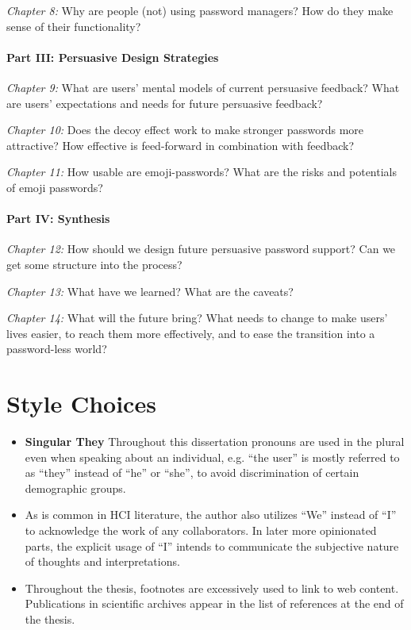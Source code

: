 \textit{Chapter 8:} %
Why are people (not) using password managers?
How do they make sense of their functionality?


\paragraph{Part III: Persuasive Design Strategies}
\textit{Chapter 9:} %
What are users' mental models of current persuasive feedback?
What are users' expectations and needs for future persuasive feedback?

\textit{Chapter 10:} %
Does the decoy effect work to make stronger passwords more attractive?
How effective is feed-forward in combination with feedback?

\textit{Chapter 11:} %
How usable are emoji-passwords?
What are the risks and potentials of emoji passwords?

\paragraph{Part IV: Synthesis}
\textit{Chapter 12:} %
How should we design future persuasive password support?
Can we get some structure into the process? 

\textit{Chapter 13:} %
What have we learned? 
What are the caveats?

\textit{Chapter 14:} %
What will the future bring?
What needs to change to make users' lives easier, to reach them more effectively, and to ease the transition into a password-less world?

\section{Style Choices}
\begin{itemize}
\item \textbf{Singular They} Throughout this dissertation pronouns are used in the plural even when speaking about an individual, e.g. ``the user'' is mostly referred to as ``they'' instead of ``he'' or ``she'', to avoid discrimination of certain demographic groups. 
\item As is common in HCI literature, the author also utilizes ``We'' instead of ``I'' to acknowledge the work of any collaborators. In later more opinionated parts, the explicit usage of ``I'' intends to communicate the subjective nature of thoughts and interpretations.
\item Throughout the thesis, footnotes are excessively used to link to web content. Publications in scientific archives appear in the list of references at the end of the thesis.
\end{itemize}
